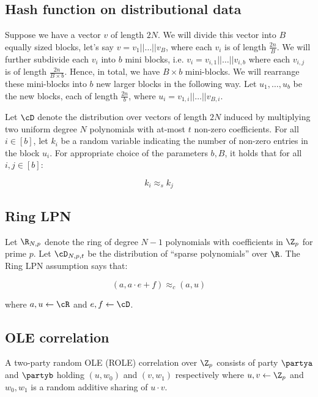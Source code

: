 \subsection{Hash function on distributional data}

Suppose we have a vector $v$ of length $2N$. We will divide this vector into $B$ equally sized blocks, let's say $v = v_1 || \ldots || v_B$, where each $v_i$ is of length $\frac{2n}{B}$. We will further subdivide each $v_i$ into $b$ mini blocks, i.e. $v_i = v_{i, 1} || \ldots || v_{i, b}$ where each $v_{i, j}$ is of length $\frac{2n}{B \times b}$. Hence, in total, we have $B \times b$ mini-blocks. We will rearrange these mini-blocks into $b$ new larger blocks in the following way. Let $u_1, \ldots, u_b$ be the new blocks, each of length $\frac{2n}{b}$, where $u_i = v_{1, i} || \ldots || v_{B, i}$.

\begin{claim}
  Let $\cD$ denote the distribution over vectors of length $2N$ induced by multiplying two uniform degree $N$ polynomials with at-most $t$ non-zero coefficients. For all $i \in [b]$, let $k_i$ be a random variable indicating the number of non-zero entries in the block $u_i$. For appropriate choice of the parameters $b, B$, it holds that for all $i, j \in [b]$:

  $$k_i \approx_s k_j$$
\end{claim}

\subsection{Ring LPN}

\begin{definition}
  Let $\R_{N, p}$ denote the ring of degree $N - 1$ polynomials with coefficients in $\Z_p$ for prime $p$. Let $\cD_{N, p, t}$ be the distribution of ``sparse polynomials'' over $\R$. The Ring LPN assumption says that:

  $$(a, a \cdot e + f) \approx_c (a, u)$$

  where $a, u \gets \cR$ and $e, f \gets \cD$.
\end{definition}

\subsection{OLE correlation}

A two-party random OLE (ROLE) correlation over $\Z_p$ consists of party $\partya$ and $\partyb$ holding $(u, w_0)$ and $(v, w_1)$ respectively where $u, v \gets \Z_p$ and $w_0, w_1$ is a random additive sharing of $u \cdot v$.\\

